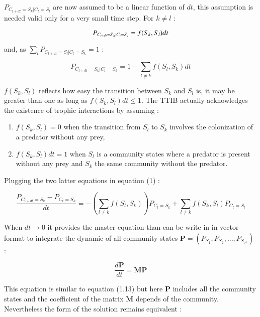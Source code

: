\(P_{C_{t+dt}=S_k|C_{t}=S_l}\) are now assumed to be a linear function
of \(dt\), this assumption is needed valid only for a very small time
step. For \(k \neq l\) :

\begin{equation}
P_{C_{t+dt}=S_k|C_{t}=S_l} = f(S_k,S_l)dt \\
\end{equation}

and, as \(\sum_l P_{C_{t+dt}=S_l|C_{t}=S_k} = 1\) :

\begin{equation}
P_{C_{t+dt}=S_k|C_{t}=S_k} = 1-\sum_{l \neq k}f(S_l,S_k)dt
\end{equation}

\(f(S_k,S_l)\) reflects how easy the transition between \(S_k\) and
\(S_l\) is, it may be greater than one as long as
\(f(S_k,S_l)dt\leqslant1\). The TTIB actually acknowledges the existence
of trophic interactions by assuming :

\begin{enumerate}
\def\labelenumi{\arabic{enumi}.}
\tightlist
\item
  \(f(S_k,S_l)=0\) when the transition from \(S_l\) to \(S_k\) involves
  the colonization of a predator without any prey,
\item
  \(f(S_k,S_l)dt=1\) when \(S_l\) is a community states where a predator
  is present without any prey and \(S_k\) the same community without the
  predator.
\end{enumerate}

Plugging the two latter equations in equation (1) :

\begin{equation}
\frac{P_{C_{t+dt}=S_{k}}-P_{C_{t}=S_{k}}}{dt} = -\left(\sum_{l \neq k}f(S_l,S_k)\right)P_{C_{t}=S_{k}} + \sum_{l \neq k}f(S_k,S_l)P_{C_{t}=S_{l}}
\end{equation}

When \(dt \rightarrow 0\) it provides the master equation than can be
write in in vector format to integrate the dynamic of all community
states \(\mathbf{P}=(P_{S_1}, P_{S_2}, ..., P_{S_{2^T}})\) :

\begin{equation}
\frac{d\mathbf{P}}{dt} = \mathbf{M}\mathbf{P}
\end{equation}

This equation is similar to equation (1.13) but here \(\mathbf{P}\)
includes all the community states and the coefficient of the matrix
\(\mathbf{M}\) depends of the community. Nevertheless the form of the
solution remains equivalent :

